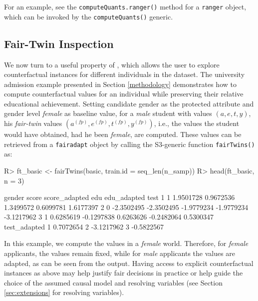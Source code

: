 \documentclass[
  nojss]{jss}
\begin{document}
For an example, see the \texttt{computeQuants.ranger()} method for a
\texttt{ranger} object, which can be invoked by the
\texttt{computeQuants()} generic.

\hypertarget{fair-twin-inspection}{%
\subsection{Fair-Twin Inspection}\label{fair-twin-inspection}}

We now turn to a useful property of , which allows the
user to explore counterfactual instances for different individuals in
the dataset. The university admission example presented in Section
\ref{methodology} demonstrates how to compute counterfactual values for
an individual while preserving their relative educational achievement.
Setting candidate gender as the protected attribute and gender level
\emph{female} as baseline value, for a \emph{male} student with values
\((a, e, t, y)\), his \emph{fair-twin} values
\(( {a}^{(fp)},  {e}^{(fp)},  {t}^{(fp)},  {y}^{(fp)})\), i.e., the
values the student would have obtained, had he been \emph{female}, are
computed. These values can be retrieved from a \texttt{fairadapt} object
by calling the S3-generic function \texttt{fairTwins()} as:

\begin{CodeChunk}
\begin{CodeInput}
R> ft_basic <- fairTwins(basic, train.id = seq_len(n_samp))
R> head(ft_basic, n = 3)
\end{CodeInput}
\begin{CodeOutput}
  gender      score score_adapted        edu edu_adapted       test
1      1  1.9501728     0.9672536  1.3499572   0.6099781  1.6177397
2      0 -2.3502495    -2.3502495 -1.9779234  -1.9779234 -3.1217962
3      1  0.6285619    -0.1297838  0.6263626  -0.2482064  0.5300347
  test_adapted
1    0.7072654
2   -3.1217962
3   -0.5822567
\end{CodeOutput}
\end{CodeChunk}

In this example, we compute the values in a \emph{female} world.
Therefore, for \emph{female} applicants, the values remain fixed, while
for \emph{male} applicants the values are adapted, as can be seen from
the output. Having access to explicit counterfactual instances as above
may help justify fair decisions in practice or help guide the choice of
the assumed causal model and resolving variables (see Section
\ref{sec:extensions} for resolving variables).
\end{document}
